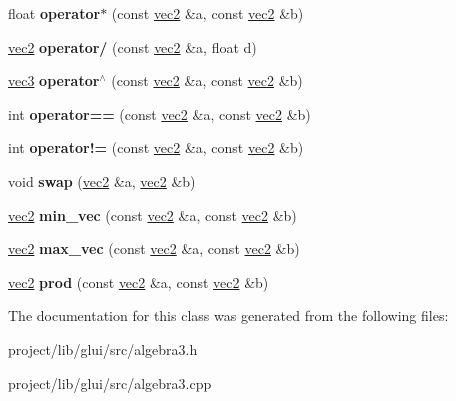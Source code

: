 \begin{DoxyCompactItemize}
\item 
\hypertarget{classvec2_ab2d6c7aa61948785e334abbc6d06af22}{float {\bfseries operator$\ast$} (const \hyperlink{classvec2}{vec2} \&a, const \hyperlink{classvec2}{vec2} \&b)}\label{classvec2_ab2d6c7aa61948785e334abbc6d06af22}

\item 
\hypertarget{classvec2_ac039e11bc3163c3b2a73f618466ba1cc}{\hyperlink{classvec2}{vec2} {\bfseries operator/} (const \hyperlink{classvec2}{vec2} \&a, float d)}\label{classvec2_ac039e11bc3163c3b2a73f618466ba1cc}

\item 
\hypertarget{classvec2_aac6b3e1eec62f338713b46d70c63d7d3}{\hyperlink{classvec3}{vec3} {\bfseries operator$^\wedge$} (const \hyperlink{classvec2}{vec2} \&a, const \hyperlink{classvec2}{vec2} \&b)}\label{classvec2_aac6b3e1eec62f338713b46d70c63d7d3}

\item 
\hypertarget{classvec2_afdf120b1c31612eaba7789d6fda1d8c1}{int {\bfseries operator==} (const \hyperlink{classvec2}{vec2} \&a, const \hyperlink{classvec2}{vec2} \&b)}\label{classvec2_afdf120b1c31612eaba7789d6fda1d8c1}

\item 
\hypertarget{classvec2_aea40727983a519330d962da873e04c51}{int {\bfseries operator!=} (const \hyperlink{classvec2}{vec2} \&a, const \hyperlink{classvec2}{vec2} \&b)}\label{classvec2_aea40727983a519330d962da873e04c51}

\item 
\hypertarget{classvec2_a9b33ecbc9fbb7e87fdbcef79dac05d2a}{void {\bfseries swap} (\hyperlink{classvec2}{vec2} \&a, \hyperlink{classvec2}{vec2} \&b)}\label{classvec2_a9b33ecbc9fbb7e87fdbcef79dac05d2a}

\item 
\hypertarget{classvec2_aff3e8468eb3b4266eb4419946108b775}{\hyperlink{classvec2}{vec2} {\bfseries min\-\_\-vec} (const \hyperlink{classvec2}{vec2} \&a, const \hyperlink{classvec2}{vec2} \&b)}\label{classvec2_aff3e8468eb3b4266eb4419946108b775}

\item 
\hypertarget{classvec2_a63686a4102a83cf5bbce825b19e0e388}{\hyperlink{classvec2}{vec2} {\bfseries max\-\_\-vec} (const \hyperlink{classvec2}{vec2} \&a, const \hyperlink{classvec2}{vec2} \&b)}\label{classvec2_a63686a4102a83cf5bbce825b19e0e388}

\item 
\hypertarget{classvec2_ab34a15f1b0458bd038c54775fe93dbf6}{\hyperlink{classvec2}{vec2} {\bfseries prod} (const \hyperlink{classvec2}{vec2} \&a, const \hyperlink{classvec2}{vec2} \&b)}\label{classvec2_ab34a15f1b0458bd038c54775fe93dbf6}

\end{DoxyCompactItemize}


The documentation for this class was generated from the following files\-:\begin{DoxyCompactItemize}
\item 
project/lib/glui/src/algebra3.\-h\item 
project/lib/glui/src/algebra3.\-cpp\end{DoxyCompactItemize}
